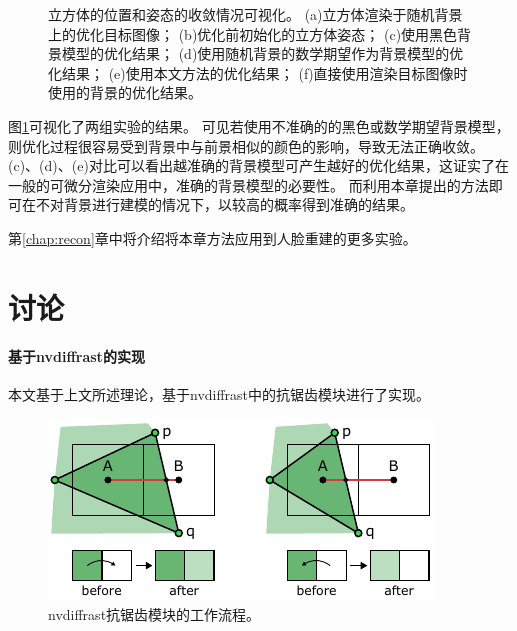 \begin{figure}
    \caption[立方体的位置和姿态的收敛情况可视化]{
        立方体的位置和姿态的收敛情况可视化。
        (a)立方体渲染于随机背景上的优化目标图像；
        (b)优化前初始化的立方体姿态；
        (c)使用黑色背景模型的优化结果；
        (d)使用随机背景的数学期望作为背景模型的优化结果；
        (e)使用本文方法的优化结果；
        (f)直接使用渲染目标图像时使用的背景的优化结果。
    }
    \label{fig:cube_opt_vis}
\end{figure}
图\ref{fig:cube_opt_vis}可视化了两组实验的结果。
可见若使用不准确的的黑色或数学期望背景模型，则优化过程很容易受到背景中与前景相似的颜色的影响，导致无法正确收敛。
(c)、(d)、(e)对比可以看出越准确的背景模型可产生越好的优化结果，这证实了在一般的可微分渲染应用中，准确的背景模型的必要性。
而利用本章提出的方法即可在不对背景进行建模的情况下，以较高的概率得到准确的结果。

第\ref{chap:recon}章中将介绍将本章方法应用到人脸重建的更多实验。

\section{讨论}
\label{sec:method_discuss}

\paragraph{基于nvdiffrast的实现}
本文基于上文所述理论，基于nvdiffrast\citep{nvdiffrast}中的抗锯齿模块进行了实现。

\begin{figure}
    \centering
    \includegraphics{figures/antialias}
    \caption[nvdiffrast抗锯齿模块的工作流程]{nvdiffrast抗锯齿模块的工作流程\citep{nvdiffrast}。}
    \label{fig:aa}
\end{figure}

